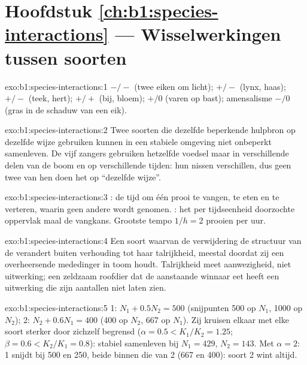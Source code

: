 \section*{Hoofdstuk \ref{ch:b1:species-interactions} --- Wisselwerkingen tussen soorten}

\begin{solution}{exo:b1:species-interactions:1}
 $-/-$ (twee eiken om licht);  $+/-$ (lynx, haas);
 $+/-$ (teek, hert);  $+/+$ (bij, bloem);
 $+/0$ (varen op bast); amensalisme $-/0$ (gras in de schaduw
van een eik).
\end{solution}

\begin{solution}{exo:b1:species-interactions:2}
Twee soorten die dezelfde beperkende hulpbron op dezelfde wijze gebruiken
kunnen in een stabiele omgeving niet onbeperkt samenleven. De vijf zangers
gebruiken hetzelfde voedsel maar in verschillende delen van de boom en op
verschillende tijden: hun nissen verschillen, dus geen twee van hen doen het
op ``dezelfde wijze''.
\end{solution}

\begin{solution}{exo:b1:species-interactions:3}
: de tijd om één prooi te vangen, te eten en te verteren, waarin
geen andere wordt genomen. : het per tijdseenheid doorzochte
oppervlak maal de vangkans. Grootste tempo $1/h = 2$ prooien per
uur.
\end{solution}

\begin{solution}{exo:b1:species-interactions:4}
Een soort waarvan de verwijdering de structuur van de 
verandert buiten verhouding tot haar talrijkheid, meestal doordat zij een
overheersende mededinger in toom houdt. Talrijkheid meet aanwezigheid, niet
uitwerking; een zeldzaam roofdier dat de aanstaande winnaar eet heeft een
uitwerking die zijn aantallen niet laten zien.
\end{solution}

\begin{solution}{exo:b1:species-interactions:5}
 1: $N_1 + 0.5 N_2 = 500$ (snijpunten 500 op $N_1$, 1000 op
$N_2$);  2: $N_2 + 0.6 N_1 = 400$ (400 op $N_2$, 667 op $N_1$).
Zij kruisen elkaar met elke soort sterker door zichzelf begrensd ($\alpha = 0.5 <
K_1/K_2 = 1.25$; $\beta = 0.6 < K_2/K_1 = 0.8$): stabiel samenleven
bij $N_1 = 429$, $N_2 = 143$. Met $\alpha = 2$:  1 snijdt bij
500 en 250, beide binnen die van  2 (667 en 400): soort 2
wint altijd.
\end{solution}

